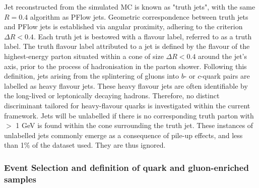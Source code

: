 Jet reconstructed from the simulated MC is known as "truth jets", with the same \antikt $R=0.4$ algorithm as PFlow jets. Geometric correspondence between truth jets and PFlow jets is established via angular proximity, adhering to the criterion $\Delta R < 0.4$. Each truth jet is bestowed with a flavour label, referred to as a truth label. The truth flavour label attributed to a jet is defined by the flavour of the highest-energy parton situated within a cone of size $\Delta R < 0.4$ around the jet's axis, prior to the process of hadronisation in the parton shower. Following this definition, jets arising from the splintering of gluons into $b$- or $c$-quark pairs are labelled as heavy flavour jets. These heavy flavour jets are often identifiable by the long-lived or leptonically decaying hadrons. Therefore, no distinct discriminant tailored for heavy-flavour quarks is investigated within the current framework. Jets will be unlabelled if there is no corresponding truth parton with \pt $>$ 1 GeV is found within the cone surrounding the truth jet. These instances of unlabelled jets commonly emerge as a consequence of pile-up effects, and less than 1\% of the dataset used. They are thus ignored.
 
 






\subsubsection{Event Selection and definition of quark and gluon-enriched samples}
\label{subsec:Event}

